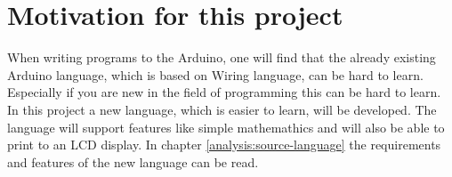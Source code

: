 \section{Motivation for this project}\label{introduction:motivation}
When writing programs to the Arduino, one will find that the already existing Arduino language, which is based on Wiring language, can be hard to learn. Especially if you are new in the field of programming this can be hard to learn. In this project a new language, which is easier to learn, will be developed. The language will support features like simple mathemathics and will also be able to print to an LCD display. In chapter \ref{analysis:source-language} the requirements and features of the new language can be read.

